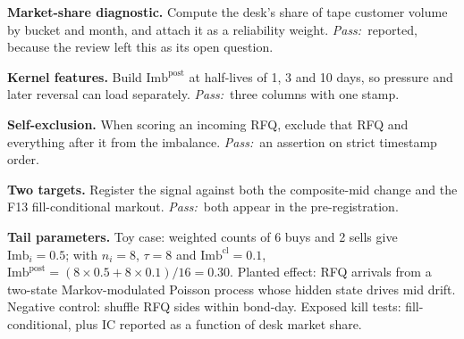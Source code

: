 \documentclass[11pt,letterpaper]{article}
\makeatletter
\newcommand{\Imb}{\mathrm{Imb}}
\newcommand*{\twodigit}[1]{\expandafter\@twodigit\csname c@#1\endcsname}
\newcommand*{\@twodigit}[1]{\ifnum#1<10 0\fi\number#1}
\newcommand{\stepname}[1]{\textbf{#1.}}
\newcommand{\Pass}{\textit{Pass:}~}
\makeatother
\begin{document}
\begin{ladder}[label=\textbf{A3.\twodigit*}]
\item \stepname{Market-share diagnostic} Compute the desk's share of tape customer volume by bucket and month, and attach it as a reliability weight. \Pass reported, because the review left this as its open question.
\item \stepname{Kernel features} Build $\Imb^{\mathrm{post}}$ at half-lives of 1, 3 and 10 days, so pressure and later reversal can load separately. \Pass three columns with one stamp.
\item \stepname{Self-exclusion} When scoring an incoming RFQ, exclude that RFQ and everything after it from the imbalance. \Pass an assertion on strict timestamp order.
\item \stepname{Two targets} Register the signal against both the composite-mid change and the F13 fill-conditional markout. \Pass both appear in the pre-registration.
\end{ladder}
\textbf{Tail parameters.} Toy case: weighted counts of 6 buys and 2 sells give $\Imb_i=0.5$; with $n_i=8$, $\tau=8$ and $\Imb^{\mathrm{cl}}=0.1$, $\Imb^{\mathrm{post}}=(8\times0.5+8\times0.1)/16=0.30$. Planted effect: RFQ arrivals from a two-state Markov-modulated Poisson process whose hidden state drives mid drift. Negative control: shuffle RFQ sides within bond-day. Exposed kill tests: fill-conditional, plus IC reported as a function of desk market share.
\end{document}
